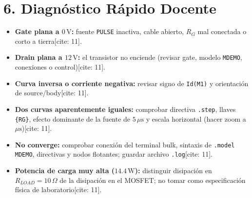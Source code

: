 \documentclass[11pt, a4paper]{article}
\begin{document}
\section*{6. Diagnóstico Rápido Docente}
\begin{itemize}[noitemsep]
    \item \textbf{Gate plana a $0\,\text{V}$:} fuente \texttt{PULSE} inactiva, cable abierto, $R_G$ mal conectada o corto a tierra[cite: 11].
    \item \textbf{Drain plana a $12\,\text{V}$:} el transistor no enciende (revisar gate, modelo \texttt{MDEMO}, conexiones o control)[cite: 11].
    \item \textbf{Curva inversa o corriente negativa:} revisar signo de \texttt{Id(M1)} y orientación de source/body[cite: 11].
    \item \textbf{Dos curvas aparentemente iguales:} comprobar directiva \texttt{.step}, llaves \texttt{\{RG\}}, efecto dominante de la fuente de $5\,\mu\text{s}$ y escala horizontal (hacer zoom a $\mu\text{s}$)[cite: 11].
    \item \textbf{No converge:} comprobar conexión del terminal bulk, sintaxis de \texttt{.model MDEMO}, directivas y nodos flotantes; guardar archivo \texttt{.log}[cite: 11].
    \item \textbf{Potencia de carga muy alta ($14.4\,\text{W}$):} distinguir disipación en $R_{LOAD}=10\,\Omega$ de la disipación en el MOSFET; no tomar como especificación física de laboratorio[cite: 11].
\end{itemize}
\end{document}
